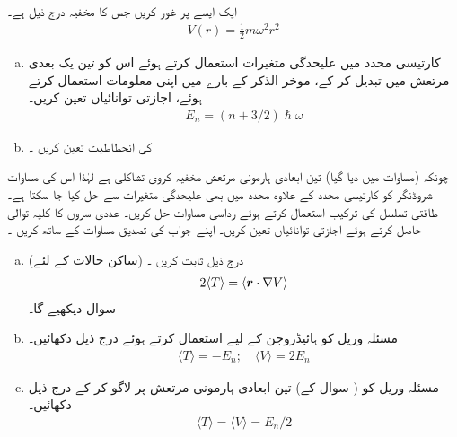 ایک ایسے   پر غور کریں جس کا مخفیہ  درج ذیل ہے۔ 
\begin{align}\label{مساوات_تین_ابعادی_ہارمونی_مخفیہ}
V(r) = \frac{1}{2} m \omega^2 r^2
\end{align}
\begin{enumerate}[a.]
\item
کارتیسی محدد میں علیحدگی متغیرات استعمال کرتے ہوئے اس کو تین  یک بعدی مرتعش میں تبدیل کر کے، موخر الذکر کے بارے میں اپنی معلومات استعمال کرتے ہوئے،  اجازتی توانائیاں تعین کریں۔  
\begin{align}\label{مساوات_تین_ابعادی_ہارمونی_اجازتی}
E_n = (n + 3/2) \hslash \omega
\end{align}
\item
{} کی   انحطاطیت   تعین کریں ۔
\end{enumerate}
چونکہ  (مساوات  میں دیا گیا)  تین ابعادی  ہارمونی مرتعش مخفیہ  کروی تشاکلی ہے لہٰذا اس کی مساوات شروڈنگر کو کارتیسی محدد کے علاوہ    محدد میں بھی علیحدگی  متغیرات سے حل کیا جا سکتا ہے۔ طاقتی تسلسل کی ترکیب استعمال کرتے ہوئے رداسی مساوات حل کریں۔ عددی سروں کا کلیہ توالی حاصل کرتے ہوئے اجازتی توانائیاں تعین کریں۔ اپنے جواب کی تصدیق مساوات  کے ساتھ کریں ۔
\begin{enumerate}[a.]
\item
(ساکن حالات کے لئے)  درج ذیل   ثابت کریں ۔
\begin{align}
2 \langle T \rangle = \langle {\ensuremath{{\boldsymbol{r}}}} \cdot \nabla V \rangle
\end{align}
  سوال  دیکھیے گا۔ 
\item
مسئلہ وریل کو ہائیڈروجن کے لیے استعمال کرتے ہوئے درج ذیل دکھائیں۔ 
\begin{align}\label{مساوات_تین_ابعادی_مسئلہ_وریل}
\langle T \rangle = - E_n; \quad \langle V \rangle = 2 E_n
\end{align}
\item
مسئلہ وریل کو ( سوال  کے)  تین ابعادی ہارمونی مرتعش پر لاگو کر کے درج ذیل دکھائیں۔ 
\begin{align}
\langle T \rangle = \langle V \rangle = E_n /2
\end{align}
\end{enumerate}
